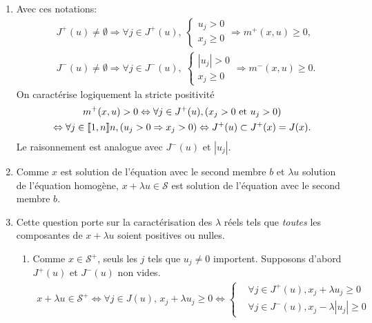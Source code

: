 \begin{enumerate}
  \item Avec ces notations:
\[
  \begin{aligned}
    &J^+(u) \neq \emptyset \Rightarrow 
    \forall j \in J^+(u), \;
    \left\lbrace
      \begin{aligned}
         u_j > 0 \\ x_j \geq 0
      \end{aligned}
     \right.
     \Rightarrow m^+(x,u) \geq 0 ,
\\
    &J^-(u) \neq \emptyset \Rightarrow 
    \forall j \in J^-(u), \;
    \left\lbrace
      \begin{aligned}
         |u_j| > 0 \\ x_j \geq 0
      \end{aligned}
     \right.
     \Rightarrow m^-(x,u) \geq 0. 
  \end{aligned}
\]
On caractérise logiquement la stricte positivité
\begin{multline*}
  m^+(x,u) > 0
  \Leftrightarrow \forall j \in J^+(u), \left( x_j>0 \text{ et } u_j >0\right) \\
  \Leftrightarrow \forall j\in \llbracket 1,n\rrbracket{n}, \left( u_j > 0 \Rightarrow x_j > 0\right) 
  \Leftrightarrow J^+(u) \subset J^+(x) = J(x).
\end{multline*}
Le raisonnement est analogue avec $J^-(u)$ et $|u_j|$.
  \item Comme $x$ est solution de l'équation avec le second membre $b$ et $\lambda u$ solution de l'équation homogène, $x + \lambda u \in \mathcal{S}$ est solution de l'équation avec le second membre $b$.
  \item Cette question porte sur la caractérisation des $\lambda$ réels tels que \emph{toutes} les composantes de $x + \lambda u$ soient positives ou nulles. 
  \begin{enumerate}
    \item Comme $x \in \mathcal{S}^+$, seuls les $j$ tels que $u_j\neq 0$ importent. Supposons d'abord $J^+(u)$ et $J^-(u)$ non vides. 
\begin{multline*}
  x + \lambda u \in \mathcal{S}^+
  \Leftrightarrow \forall j \in J(u), \, x_j + \lambda u_j \geq 0
  \Leftrightarrow
  \left\lbrace
  \begin{aligned}
    &\forall j \in J^+(u), x_j + \lambda u_j \geq 0\\
    &\forall j \in J^-(u), x_j - \lambda |u_j| \geq 0
  \end{aligned}
  \right. \\

\end{multline*}
\end{enumerate}
\end{enumerate}
